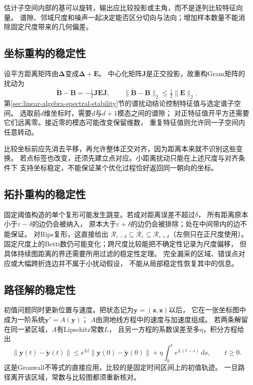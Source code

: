 估计子空间内部的基可以旋转，输出应比较投影或主角，而不是逐列比较特征向量。
谱隙、邻域尺度和噪声一起决定能否区分切向与法向；增加样本数量不能消除固定尺度带来的几何偏差。

\subsection{坐标重构的稳定性}
\label{sec:geometry-coordinate-reconstruction-stability}

设平方距离矩阵由$\bm\Delta$变成$\bm\Delta+\bm E$。
中心化矩阵$\bm J$是正交投影，故重构Gram矩阵的扰动为
\[
 \widetilde{\bm B}-\bm B=-\tfrac12\bm J\bm E\bm J,\qquad
 \lVert\widetilde{\bm B}-\bm B\rVert_2\leq\tfrac12\lVert\bm E\rVert_2.
\]
第\ref{sec:linear-algebra-spectral-stability}节的谱扰动结论控制特征值与选定谱子空间。
选取前$d$维坐标时，需要$d$与$d+1$模态之间的谱隙；
对正特征值开平方还需要它们远离零。接近零的模态可能改变保留维数，
重复特征值则允许同一子空间内任意转动。

比较坐标前应先消去平移，再允许整体正交对齐，因为距离本来就不识别这些变换。
若点标签也改变，还须先建立点对应。小距离扰动只能在上述尺度与对齐条件下
支持坐标稳定，不能保证某个优化过程恰好返回同一朝向的坐标。

\subsection{拓扑重构的稳定性}
\label{sec:geometry-topology-reconstruction-stability}

固定阈值构造的单个复形可能发生跳变。若成对距离误差不超过$\delta$，
所有距离原本小于$\varepsilon-\delta$的边仍会被纳入，
原本大于$\varepsilon+\delta$的边仍会被排除；处在中间带内的边不能保证。
对Rips复形，这直接给出
$\mathcal R_{\varepsilon-\delta}\subseteq\widetilde{\mathcal R}_{\varepsilon}
\subseteq\mathcal R_{\varepsilon+\delta}$（左侧只在正尺度使用）。
固定尺度上的Betti数仍可能变化；跨尺度比较能把不确定性记录为尺度偏移，
但具体持续图距离的界还需要所用过滤的稳定性定理。
完全漏采的区域、错误点对应或大幅跨折连边并不属于小扰动假设，
不能从局部稳定性恢复其中的信息。

\subsection{路径解的稳定性}
\label{sec:geometry-path-solution-stability}

初值问题同时更新位置与速度。把状态记为$\bm y=(\bm z,\dot{\bm z})$以后，
它在一张坐标图中成为一阶系统$\bm y'=A(\bm y)$；
$A$由测地线方程中的速度与加速度组成。
若两条解留在同一紧区域，$A$有Lipschitz常数$L$，
且另一方程的系数误差至多$\eta$，积分方程给出
\[
 \lVert \bm y(t)-\widetilde{\bm y}(t)\rVert
 \leq e^{Lt}\lVert \bm y(0)-\widetilde{\bm y}(0)\rVert
       +\eta\int_0^t e^{L(t-s)}\,\mathrm ds,\qquad t\geq0.
\]
这是Gronwall不等式的直接应用，比较的是固定时间区间上的初值轨迹。
一旦路径离开该区域，常数与比较图都须重新核对。


